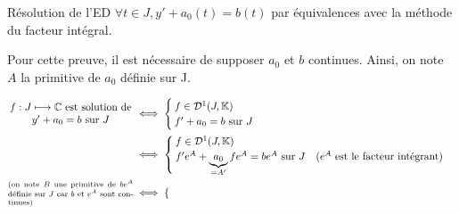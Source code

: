 \documentclass{article}
\date{10 novembre 2023}
\begin{document}
\maketitle

\begin{question_kholle}{Résolution de l'ED  $\forall t \in J, y' + a_{0}(t) = b(t)$ par équivalences avec la méthode du facteur intégral.}

  Pour cette preuve, il est nécessaire de supposer $a_{0}$ et $b$ continues.
  Ainsi, on note $A$ la primitive de $a_{0}$ définie sur J.

  \begin{align*}
    \parbox{12em}{\centering$f:J\longmapsto\C$ est solution de $y'+a_{0}=b$ sur $J$}                                      & \iff \begin{cases}
                                                                                                                                   f \in \mathcal{D}^1(J,\K) \\
                                                                                                                                   f'+ a_0 = b \text{ sur } J
                                                                                                                                 \end{cases}                                                                                                                                         \\
                                                                                                                          & \iff \begin{cases}
                                                                                                                                   f\in\mathcal{D}^1(J,\K) \\
                                                                                                                                   f' e^{A} + \underbrace{a_{0}}_{=A'}f e^{A} = b e^{A} \text{ sur } J \quad\text{($e^{A}$ est le facteur intégrant)}
                                                                                                                                 \end{cases} \\
    \parbox{12em}{\scriptsize (on note $B$ une primitive de $b e^{A}$ définie sur $J$ car $b$ et $e^{A}$ sont continues)} & \iff \begin{cases}

\end{cases}
\end{align*}
\end{question_kholle}
\end{document}
